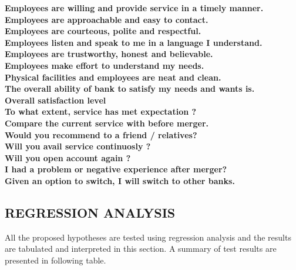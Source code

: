 \documentclass[a4paper, 12pt]{extarticle}
\begin{document}
{\textbf{ Employees are willing and provide service in a timely manner.} \\

\textbf{ Employees are approachable and easy to contact.} \\   

\textbf{ Employees are courteous, polite and respectful.} \\

\textbf{ Employees listen and speak to me in  a language I understand.} \\

\textbf{ Employees are trustworthy, honest and believable.}  \\

\textbf{ Employees make effort to understand my needs.} \\

\textbf{ Physical facilities and employees are neat and clean.}\\

\textbf{ The overall ability of bank to satisfy my needs and wants is.} \\

\textbf{ Overall satisfaction level}  \\

\textbf{ To what extent, service has met expectation ?}  \\

\textbf{ Compare the current service with before merger.}  \\

\textbf{ Would you recommend to a friend / relatives?}  \\

\textbf{ Will you avail service continuosly ?}  \\

\textbf{ Will you open account again ?} \\

\textbf{ I had a problem or negative experience after merger?}  \\

\textbf{ Given an option to switch, I will switch to other banks.} \\



\subsection{REGRESSION ANALYSIS}
All the proposed hypotheses are tested using regression analysis and the results are tabulated and interpreted in this section. A summary of test results are presented in following table.

}
\end{document}
